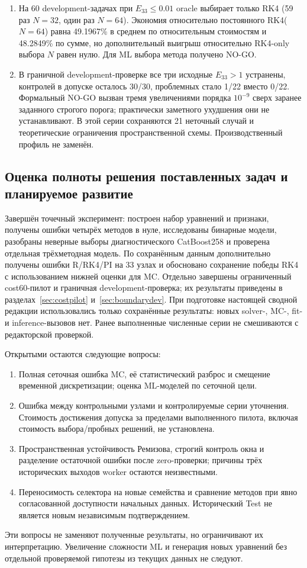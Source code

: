 \documentclass[14pt,a4paper]{extarticle}
\begin{document}
\begin{enumerate}
\item На 60 development-задачах при $E_{33}\le0.01$ oracle выбирает
только RK4 (59 раз $N=32$, один раз $N=64$). Экономия относительно
постоянного RK4($N=64$) равна 49.1967\% в среднем по относительным
стоимостям и 48.2849\% по сумме, но дополнительный выигрыш относительно
RK4-only выбора $N$ равен нулю. Для ML выбора метода получено NO-GO.
\item В граничной development-проверке все три исходные $E_{33}>1$
устранены, контролей в допуске осталось 30/30, проблемных стало
1/22 вместо 0/22. Формальный NO-GO вызван тремя увеличениями
порядка $10^{-9}$ сверх заранее заданного строгого порога; практически
заметного ухудшения они не устанавливают. В этой серии сохраняются
21 неточный случай и теоретические ограничения пространственной схемы.
Производственный профиль не заменён.
\end{enumerate}

\subsection{Оценка полноты решения поставленных задач и планируемое развитие}
Завершён точечный эксперимент: построен набор уравнений и признаки,
получены ошибки четырёх методов в нуле, исследованы бинарные модели,
разобраны неверные выборы диагностического CatBoost258 и проверена
отдельная трёхметодная модель. По сохранённым данным дополнительно
получены ошибки R/RK4/PI на 33 узлах и обосновано сохранение победы
RK4 с использованием нижней оценки для MC. Отдельно завершены
ограниченный cost60-пилот и граничная development-проверка; их результаты
приведены в разделах~\ref{sec:costpilot} и~\ref{sec:boundarydev}.
При подготовке настоящей сводной редакции использовались только
сохранённые результаты: новых solver-, MC-, fit- и inference-вызовов нет.
Ранее выполненные численные серии не смешиваются с редакторской проверкой.

Открытыми остаются следующие вопросы:
\begin{enumerate}
\item Полная сеточная ошибка MC, её статистический разброс и смещение
временной дискретизации; оценка ML-моделей по сеточной цели.
\item Ошибка между контрольными узлами и контролируемые серии
уточнения. Стоимость достижения допуска за пределами выполненного
пилота, включая стоимость выбора/пробных решений, не установлена.
\item Пространственная устойчивость Ремизова, строгий контроль окна
и разделение остаточной ошибки после zero-проверки; причины трёх
исторических выходов worker остаются неизвестными.
\item Переносимость селектора на новые семейства и сравнение методов
при явно согласованной доступности начальных данных. Исторический
Test не является новым независимым подтверждением.
\end{enumerate}
Эти вопросы не заменяют полученные результаты, но ограничивают
их интерпретацию. Увеличение сложности ML и генерация новых уравнений
без отдельной проверяемой гипотезы из текущих данных не следуют.
\end{document}
